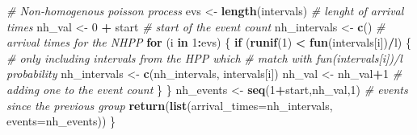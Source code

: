 \documentclass[]{article}
\newenvironment{Shaded}{\begin{snugshade}}{\end{snugshade}}
\newcommand{\CommentTok}[1]{\textcolor[rgb]{0.56,0.35,0.01}{\textit{#1}}}
\newcommand{\ControlFlowTok}[1]{\textcolor[rgb]{0.13,0.29,0.53}{\textbf{#1}}}
\newcommand{\DataTypeTok}[1]{\textcolor[rgb]{0.13,0.29,0.53}{#1}}
\newcommand{\DecValTok}[1]{\textcolor[rgb]{0.00,0.00,0.81}{#1}}
\newcommand{\KeywordTok}[1]{\textcolor[rgb]{0.13,0.29,0.53}{\textbf{#1}}}
\newcommand{\NormalTok}[1]{#1}
\newcommand{\OperatorTok}[1]{\textcolor[rgb]{0.81,0.36,0.00}{\textbf{#1}}}
\newcommand{\StringTok}[1]{\textcolor[rgb]{0.31,0.60,0.02}{#1}}
\begin{document}
\begin{Shaded}
\begin{Highlighting}[]
    \CommentTok{# Non-homogenous poisson process}
\NormalTok{    evs <-}\StringTok{ }\KeywordTok{length}\NormalTok{(intervals) }\CommentTok{# lenght of arrival times }
\NormalTok{    nh_val <-}\StringTok{ }\DecValTok{0} \OperatorTok{+}\StringTok{ }\NormalTok{start }\CommentTok{# start of the event count}
\NormalTok{    nh_intervals <-}\StringTok{ }\KeywordTok{c}\NormalTok{() }\CommentTok{# arrival times for the NHPP}
    \ControlFlowTok{for}\NormalTok{ (i }\ControlFlowTok{in} \DecValTok{1}\OperatorTok{:}\NormalTok{evs) \{}
        \ControlFlowTok{if}\NormalTok{ (}\KeywordTok{runif}\NormalTok{(}\DecValTok{1}\NormalTok{) }\OperatorTok{<}\StringTok{ }\KeywordTok{fun}\NormalTok{(intervals[i])}\OperatorTok{/}\NormalTok{l) \{ }
            \CommentTok{# only including intervals from the HPP which}
            \CommentTok{# match with fun(intervals[i])/l probability}
\NormalTok{            nh_intervals <-}\StringTok{ }\KeywordTok{c}\NormalTok{(nh_intervals, intervals[i]) }
\NormalTok{            nh_val <-}\StringTok{ }\NormalTok{nh_val}\OperatorTok{+}\DecValTok{1} \CommentTok{# adding one to the event count}
\NormalTok{        \}}
\NormalTok{    \}}
\NormalTok{    nh_events <-}\StringTok{ }\KeywordTok{seq}\NormalTok{(}\DecValTok{1}\OperatorTok{+}\NormalTok{start,nh_val,}\DecValTok{1}\NormalTok{) }\CommentTok{# events since the previous group}
    \KeywordTok{return}\NormalTok{(}\KeywordTok{list}\NormalTok{(}\DataTypeTok{arrival_times=}\NormalTok{nh_intervals, }\DataTypeTok{events=}\NormalTok{nh_events))}
\NormalTok{\}}
\end{Highlighting}
\end{Shaded}

\newpage
\end{document}

